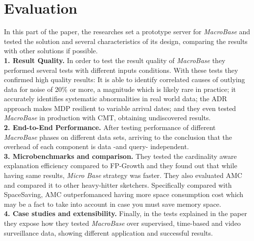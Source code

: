\documentclass[11pt, titlepage]{article}
\begin{document}
	\section{Evaluation}
		In this part of the paper, the researches set a prototype server for \textit{MacroBase} and tested the solution and several characteristics of its design, comparing the results with other solutions if possible.
		\\\textbf{1. Result Quality.} In order to test the result quality of \textit{MacroBase} they performed several tests with different inputs conditions. With these tests they confirmed high quality results: It is able to identify correlated causes of outlying data for noise of 20\% or more, a magnitude which is likely rare in practice; it accurately identifies systematic abnormalities in real world data; the ADR approach makes MDP resilient to variable arrival dates; and they even tested \textit{MacroBase} in production with CMT, obtaining undiscovered results.
		\\\textbf{2. End-to-End Performance.} After testing performance of different \textit{MacroBase} phases on different data sets, arriving to the conclusion that the overhead of each component is data -and query- independent.
		\\\textbf{3. Microbenchmarks and comparison.} They tested the cardinality aware explanation efficiency compared to FP-Growth and they found out that while having same results, \textit{Micro Base} strategy was faster. They also evaluated AMC and compared it to other heavy-hitter sketchers. Specifically compared with SpaceSaving, AMC outperfomanced having more space consumption cost which may be a fact to take into account in case you must save memory space.
		\\\textbf{4. Case studies and extensibility.} Finally, in the tests explained in the paper they expose how they tested \textit{MacroBase} over supervised, time-based and video surveillance data, showing different application and successful results.
\end{document}
